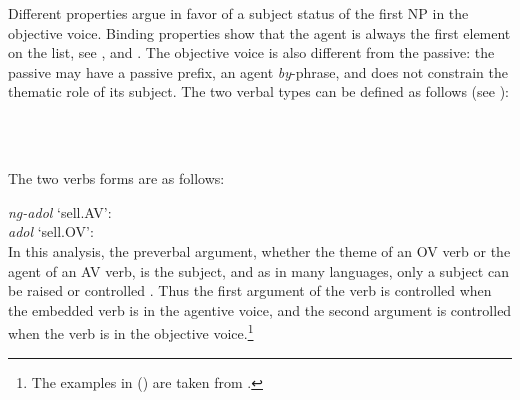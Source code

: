 Different properties argue in favor of a subject status of the first NP in the objective
voice. Binding properties show that the agent is always the first element on the \argst list, see
,  and . The objective
voice is also different from the passive: the passive may have a passive prefix, an agent
\emph{by}-phrase, and does not constrain the thematic role of its subject. The two verbal types can
be defined as follows (see ):

\eal
\ex 
{} \impl\\
\ex 
{} \impl\\
\zl

The two verbs forms are as follows:

\eal
\ex 
\emph{ng-adol} `sell.AV':\\
\ex 
\emph{adol} `sell.OV':\\
\zl
In this analysis, the preverbal argument, whether the theme of an OV verb or the agent of an AV
verb, is the subject, and as in many languages, only a subject can be raised or controlled
\citep{Zaenenetal1985}. Thus the first argument of the verb is controlled when the embedded verb is
in the agentive voice, and the second argument
is controlled when the verb is in the objective
voice.\footnote{%
  The examples in () are taken from .
}


